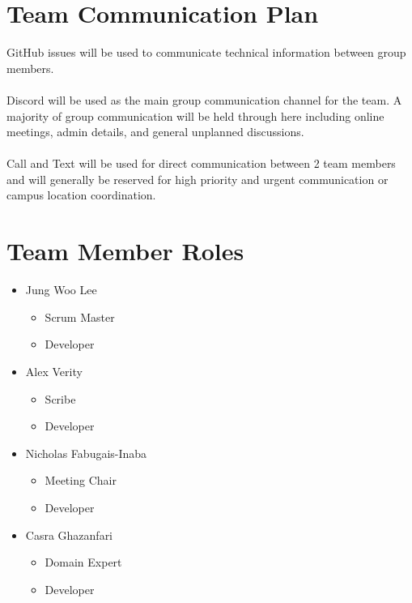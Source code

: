 \documentclass{article}
\begin{document}
\section{Team Communication Plan}


\indent GitHub issues will be used to communicate technical information 
between group members.
\\
\\
\indent Discord will be used as the main group communication channel for the team. A majority 
of group communication will be held through here including online meetings, admin details, 
and general unplanned discussions. 
\\
\\
\indent Call and Text will be used for direct communication between 2 team members
and will generally be reserved for high priority and urgent communication or 
campus location coordination. 

\section{Team Member Roles}


\begin{itemize}
	\item Jung Woo Lee
	\begin{itemize}
	  \item Scrum Master
	  \item Developer
  \end{itemize}
	\item Alex Verity
  \begin{itemize}
    \item Scribe
	  \item Developer
  \end{itemize}
  \item Nicholas Fabugais-Inaba
  \begin{itemize}
    \item Meeting Chair
	  \item Developer
  \end{itemize}
  \item Casra Ghazanfari
  \begin{itemize}
    \item Domain Expert
	  \item Developer
  \end{itemize}
\end{itemize}
\end{document}
